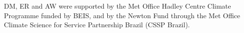 \documentclass[gmd, manuscript]{copernicus}
\begin{document}





\begin{acknowledgements}

DM, ER and AW were supported by the Met Office Hadley Centre Climate Programme funded by BEIS, and by the Newton Fund through the Met Office Climate Science for Service Partnership Brazil (CSSP Brazil).

\end{acknowledgements}








 


\end{document}
